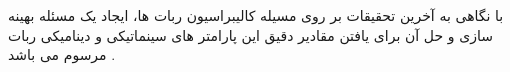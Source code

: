 با نگاهی به آخرین تحقیقات بر روی مسيله کالیبراسیون ربات ها، ایجاد یک مسئله بهینه سازی و حل آن برای یافتن مقادیر دقیق این پارامتر های سینماتیکی و دینامیکی ربات مرسوم می باشد
\cite{elatta2004overview,ida2019automatic,ida2022identification,ida2021dynamics}.

 
 
 
 
 
 
 
 
 
 
 
 
 
 
 
 
 
 
 
 
 
 
 
 
 
 
 
 
 